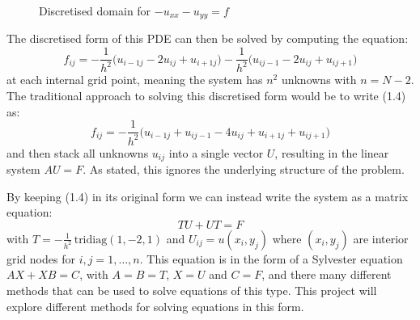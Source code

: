 \documentclass{article}
\numberwithin{equation}{section}
\begin{document}
\begin{figure}[H]
\centering
\caption{Discretised domain for $-u_{xx}-u_{yy}=f$}
\end{figure}

The discretised form of this PDE can then be solved by computing the equation:
	\begin{equation}
	f_{ij} = -\frac{1}{h^2} \big( u_{i-1j} - 2u_{ij} + u_{i+1j} \big) - \frac{1}{h^2} \big( u_{ij-1} - 2u_{ij} + u_{ij+1} \big)
	\end{equation}
at each internal grid point, meaning the system has $n^2$ unknowns with $n=N-2$. The traditional approach to solving this discretised form would be to write (1.4) as:
	\begin{equation}
	f_{ij} = -\frac{1}{h^2} \big( u_{i-1j} + u_{ij-1} - 4u_{ij} + u_{i+1j} + u_{ij+1}  \big)
	\end{equation}
and then stack all unknowns $u_{ij}$ into a single vector $U$, resulting in the linear system $AU=F$. As stated, this ignores the underlying structure of the problem.

By keeping (1.4) in its original form we can instead write the system as a matrix equation:
	\begin{equation} 
	TU + UT = F
	\end{equation}
with $T=-\frac{1}{h^2} \, \text{tridiag}(1,-2,1)$ and $U_{ij} = u(x_i, y_j)$ where $(x_i, y_j)$ are interior grid nodes for $i,j=1,\dots,n$. This equation is in the form of a Sylvester equation $AX + XB = C$, with $A=B=T$, $X=U$ and $C=F$, and there many different methods that can be used to solve equations of this type. This project will explore different methods for solving equations in this form. 
\end{document}
